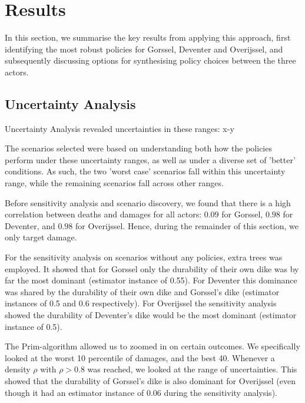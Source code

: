 \section{Results}
\label{s:results}

In this section, we summarise the key results from applying this approach, first identifying the most robust policies for Gorssel, Deventer and Overijssel, and subsequently discussing options for synthesising policy choices between the three actors. 


\subsection{Uncertainty Analysis}
Uncertainty Analysis revealed uncertainties in these ranges: x-y

The scenarios selected were based on understanding both how the policies perform under these uncertainty ranges, as well as under a diverse set of 'better' conditions. As such, the two 'worst case' scenarios fall within this uncertainty range, while the remaining scenarios fall across other ranges.


Before sensitivity analysis and scenario discovery, we found that there is a high correlation between deaths and damages for all actors: $0.09$ for Gorssel, $0.98$ for Deventer, and $0.98$ for Overijssel. Hence, during the remainder of this section, we only target damage.

For the sensitivity analysis on scenarios without any policies, extra trees was employed. It showed that for Gorssel only the durability of their own dike was by far the most dominant (estimator instance of 0.55). For Deventer this dominance was shared by the durability of their own dike and Gorssel's dike (estimator instances of 0.5 and 0.6 respectively). For Overijssel the sensitivity analysis showed the durability of Deventer's dike would be the most dominant (estimator instance of 0.5).

The Prim-algorithm allowed us to zoomed in on certain outcomes. We specifically looked at the worst 10 percentile of damages, and the best 40. Whenever a density $\rho$ with $\rho>0.8$ was reached, we looked at the range of uncertainties. This showed that the durability of Gorssel's dike is also dominant for Overijssel (even though it had an estimator instance of 0.06 during the sensitivity analysis).

